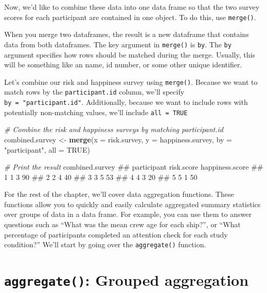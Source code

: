\documentclass[]{book}
\newenvironment{Shaded}{\begin{snugshade}}{\end{snugshade}}
\newcommand{\KeywordTok}[1]{\textcolor[rgb]{0.13,0.29,0.53}{\textbf{{#1}}}}
\newcommand{\DataTypeTok}[1]{\textcolor[rgb]{0.13,0.29,0.53}{{#1}}}
\newcommand{\StringTok}[1]{\textcolor[rgb]{0.31,0.60,0.02}{{#1}}}
\newcommand{\CommentTok}[1]{\textcolor[rgb]{0.56,0.35,0.01}{\textit{{#1}}}}
\newcommand{\OtherTok}[1]{\textcolor[rgb]{0.56,0.35,0.01}{{#1}}}
\newcommand{\NormalTok}[1]{{#1}}
\theoremstyle{definition}
\theoremstyle{definition}
\theoremstyle{remark}
\begin{document}
Now, we'd like to combine these data into one data frame so that the two
survey scores for each participant are contained in one object. To do
this, use \texttt{merge()}.

When you merge two dataframes, the result is a new dataframe that
contains data from both dataframes. The key argument in \texttt{merge()}
is \texttt{by}. The \texttt{by} argument specifies how rows should be
matched during the merge. Usually, this will be something like an name,
id number, or some other unique identifier.

Let's combine our risk and happiness survey using \texttt{merge()}.
Because we want to match rows by the \texttt{participant.id} column,
we'll specify \texttt{by\ =\ "participant.id"}. Additionally, because we
want to include rows with potentially non-matching values, we'll include
\texttt{all\ =\ TRUE}

\begin{Shaded}
\begin{Highlighting}[]
\CommentTok{# Combine the risk and happiness surveys by matching participant.id}
\NormalTok{combined.survey <-}\StringTok{ }\KeywordTok{merge}\NormalTok{(}\DataTypeTok{x =} \NormalTok{risk.survey,}
                         \DataTypeTok{y =} \NormalTok{happiness.survey,}
                         \DataTypeTok{by =} \StringTok{"participant"}\NormalTok{,}
                         \DataTypeTok{all =} \OtherTok{TRUE}\NormalTok{)}

\CommentTok{# Print the result}
\NormalTok{combined.survey}
\NormalTok{##   participant risk.score happiness.score}
\NormalTok{## 1           1          3              90}
\NormalTok{## 2           2          4              40}
\NormalTok{## 3           3          5              53}
\NormalTok{## 4           4          3              20}
\NormalTok{## 5           5          1              50}
\end{Highlighting}
\end{Shaded}

For the rest of the chapter, we'll cover data aggregation functions.
These functions allow you to quickly and easily calculate aggregated
summary statistics over groups of data in a data frame. For example, you
can use them to answer questions such as ``What was the mean crew age
for each ship?'', or ``What percentage of participants completed an
attention check for each study condition?'' We'll start by going over
the \texttt{aggregate()} function.

\section{\texorpdfstring{\texttt{aggregate()}: Grouped
aggregation}{aggregate(): Grouped aggregation}}\label{aggregate-grouped-aggregation}
\end{document}
